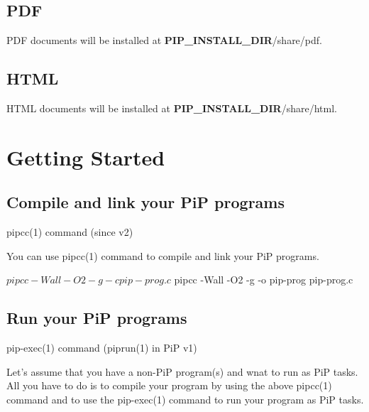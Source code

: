 \subsection*{P\-D\-F}

P\-D\-F documents will be installed at {\bfseries P\-I\-P\-\_\-\-I\-N\-S\-T\-A\-L\-L\-\_\-\-D\-I\-R}/share/pdf.

\subsection*{H\-T\-M\-L}

H\-T\-M\-L documents will be installed at {\bfseries P\-I\-P\-\_\-\-I\-N\-S\-T\-A\-L\-L\-\_\-\-D\-I\-R}/share/html.

\section*{Getting Started}

\subsection*{Compile and link your Pi\-P programs}


\begin{DoxyItemize}
\item pipcc(1) command (since v2)
\end{DoxyItemize}

You can use pipcc(1) command to compile and link your Pi\-P programs. \begin{DoxyVerb}$ pipcc -Wall -O2 -g -c pip-prog.c
$ pipcc -Wall -O2 -g -o pip-prog pip-prog.c
\end{DoxyVerb}


\subsection*{Run your Pi\-P programs}


\begin{DoxyItemize}
\item pip-\/exec(1) command (piprun(1) in Pi\-P v1)
\end{DoxyItemize}

Let's assume that you have a non-\/\-Pi\-P program(s) and wnat to run as Pi\-P tasks. All you have to do is to compile your program by using the above pipcc(1) command and to use the pip-\/exec(1) command to run your program as Pi\-P tasks. 


